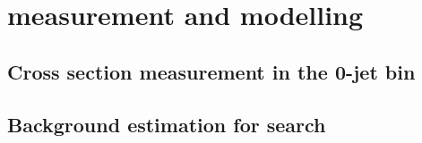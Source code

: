 
\chapter{\WW measurement and modelling}
\label{chap:ww}

\section{Cross section measurement in the 0-jet bin}
	\label{sec:ww_meas}
	
\section{Background estimation for \HWW search}
	\label{sec:ww_as_bkg}
	



